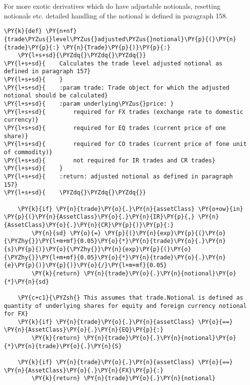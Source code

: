 For more exotic derivatives which do have adjustable notionals,
resetting notionals etc. detailed handling of the notional is defined in
paragraph 158.

    \begin{tcolorbox}[breakable, size=fbox, boxrule=1pt, pad at break*=1mm,colback=cellbackground, colframe=cellborder]
\begin{Verbatim}[commandchars=\\\{\}]
\PY{k}{def} \PY{n+nf}{trade\PYZus{}level\PYZus{}adjusted\PYZus{}notional}\PY{p}{(}\PY{n}{trade}\PY{p}{:} \PY{n}{Trade}\PY{p}{)}\PY{p}{:}
    \PY{l+s+sd}{\PYZdq{}\PYZdq{}\PYZdq{}}
\PY{l+s+sd}{    Calculates the trade level adjusted notional as defined in paragraph 157}
\PY{l+s+sd}{    }
\PY{l+s+sd}{    :param trade: Trade object for which the adjusted notional should be calculated}
\PY{l+s+sd}{    :param underlying\PYZus{}price: }
\PY{l+s+sd}{        required for FX trades (exchange rate to domestic currency)}
\PY{l+s+sd}{        required for EQ trades (current price of one share)}
\PY{l+s+sd}{        required for CO trades (current price of fone unit of commodity)}
\PY{l+s+sd}{        not required for IR trades and CR trades}
\PY{l+s+sd}{    }
\PY{l+s+sd}{    :return: adjusted notional as defined in paragraph 157}
\PY{l+s+sd}{    \PYZdq{}\PYZdq{}\PYZdq{}}
    
    \PY{k}{if} \PY{n}{trade}\PY{o}{.}\PY{n}{assetClass} \PY{o+ow}{in} \PY{p}{(}\PY{n}{AssetClass}\PY{o}{.}\PY{n}{IR}\PY{p}{,} \PY{n}{AssetClass}\PY{o}{.}\PY{n}{CR}\PY{p}{)}\PY{p}{:}
        \PY{n}{sd} \PY{o}{=} \PY{p}{(}\PY{n}{exp}\PY{p}{(}\PY{o}{\PYZhy{}}\PY{l+m+mf}{0.05}\PY{o}{*}\PY{n}{trade}\PY{o}{.}\PY{n}{s}\PY{p}{)}\PY{o}{\PYZhy{}}\PY{n}{exp}\PY{p}{(}\PY{o}{\PYZhy{}}\PY{l+m+mf}{0.05}\PY{o}{*}\PY{n}{trade}\PY{o}{.}\PY{n}{e}\PY{p}{)}\PY{p}{)}\PY{o}{/}\PY{l+m+mf}{0.05}
        \PY{k}{return} \PY{n}{trade}\PY{o}{.}\PY{n}{notional}\PY{o}{*}\PY{n}{sd}
    
    \PY{c+c1}{\PYZsh{} This assumes that trade.Notional is defined as quantity of underlying shares for equity and foreign currency notional for FX}
    \PY{k}{if} \PY{n}{trade}\PY{o}{.}\PY{n}{assetClass} \PY{o}{==} \PY{n}{AssetClass}\PY{o}{.}\PY{n}{EQ}\PY{p}{:}
        \PY{k}{return} \PY{n}{trade}\PY{o}{.}\PY{n}{notional}\PY{o}{*}\PY{n}{trade}\PY{o}{.}\PY{n}{S}
    
    \PY{k}{if} \PY{n}{trade}\PY{o}{.}\PY{n}{assetClass} \PY{o}{==} \PY{n}{AssetClass}\PY{o}{.}\PY{n}{FX}\PY{p}{:}
        \PY{k}{return} \PY{n}{trade}\PY{o}{.}\PY{n}{notional}
\end{Verbatim}
\end{tcolorbox}

